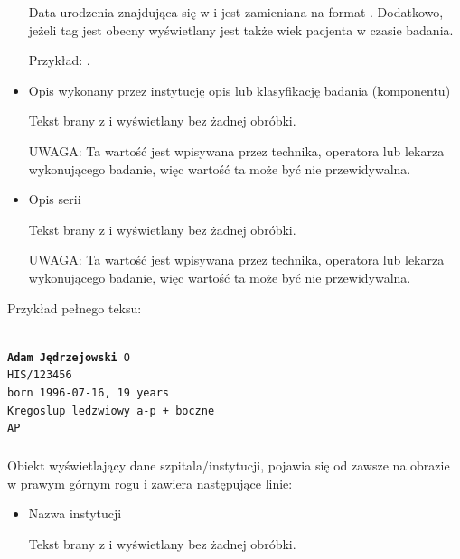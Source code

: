 \begin{itemize}
          Data urodzenia znajdująca się w  i jest zamieniana na format .
          Dodatkowo, jeżeli tag  jest obecny wyświetlany jest także wiek pacjenta w czasie badania.

          Przykład: .

    \item Opis wykonany przez instytucję opis lub klasyfikację badania (komponentu)

          Tekst brany z  i wyświetlany bez żadnej obróbki.

          UWAGA: Ta wartość jest wpisywana przez technika, operatora lub lekarza wykonującego badanie, więc wartość ta może być nie przewidywalna.

    \item Opis serii

          Tekst brany z  i wyświetlany bez żadnej obróbki.

          UWAGA: Ta wartość jest wpisywana przez technika, operatora lub lekarza wykonującego badanie, więc wartość ta może być nie przewidywalna.
\end{itemize}

Przykład pełnego teksu:

\texttt{\\
    \textbf{Adam Jędrzejowski} O\\
    HIS/123456\\
    born 1996-07-16, 19 years\\
    Kregoslup ledzwiowy a-p + boczne\\
    AP
}

\subsubsection{}

Obiekt wyświetlający dane szpitala/instytucji, pojawia się od zawsze na obrazie w prawym górnym rogu i zawiera następujące linie:
\begin{itemize}
    \item Nazwa instytucji

          Tekst brany z  i wyświetlany bez żadnej obróbki.

\end{itemize}

